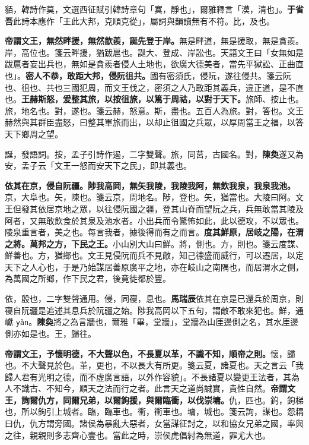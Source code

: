 \begin{quoting}貊，韓詩作莫，文選西征賦引韓詩章句「寞，靜也」，爾雅釋言「漠，清也」。\textbf{于省吾}此詩本應作「王此大邦，克順克從」，屬詞與韻讀無有不符。比，及也。\end{quoting}

\textbf{帝謂文王，無然畔援，無然歆羨，誕先登于岸。}{\footnotesize 無是畔道，無是援取，無是貪羨。岸，高位也。箋云畔援，猶跋扈也。誕大、登成、岸訟也。天語文王曰「女無如是跋扈者妄出兵也，無如是貪羨者侵人土地也，欲廣大德美者，當先平獄訟、正曲直也」。}\textbf{密人不恭，敢距大邦，侵阮徂共。}{\footnotesize 國有密須氏，侵阮，遂往侵共。箋云阮也、徂也、共也三國犯周，而文王伐之，密須之人乃敢距其義兵，違正道，是不直也。}\textbf{王赫斯怒，爰整其旅，以按徂旅，以篤于周祜，以對于天下。}{\footnotesize 旅師、按止也。旅，地名也。對，遂也。箋云赫，怒意。斯，盡也。五百人為旅。對，答也。文王赫然與其群臣盡怒，曰整其軍旅而出，以却止徂國之兵眾，以厚周當王之福，以答天下鄉周之望。}

\begin{quoting}誕，發語詞。按，孟子引詩作遏，二字雙聲。旅，同莒，古國名。對，\textbf{陳奐}遂又為安，孟子云「文王一怒而安天下之民」，即其義也。\end{quoting}

\textbf{依其在京，侵自阮疆。陟我高岡，無矢我陵，我陵我阿，無飲我泉，我泉我池。}{\footnotesize 京，大阜也。矢，陳也。箋云京，周地名。陟，登也。矢，猶當也。大陵曰阿。文王但發其依居京地之眾，以往侵阮國之疆，登其山脊而望阮之兵，兵無敢當其陵及阿者，又無敢飲食於其泉及池水者。小出兵而令驚怖如此，此以德攻，不以眾也。陵泉重言者，美之也。每言我者，據後得而有之而言。}\textbf{度其鮮原，居岐之陽，在渭之將。萬邦之方，下民之王。}{\footnotesize 小山別大山曰鮮。將，側也。方，則也。箋云度謀、鮮善也。方，猶鄉也。文王見侵阮而兵不見敵，知己德盛而威行，可以遷居，以定天下之人心也，于是乃始謀居善原廣平之地，亦在岐山之南隅也，而居渭水之側，為萬國之所鄉，作下民之君，後竟徙都於豐。}

\begin{quoting}依，殷也，二字雙聲通用。侵，同寑，息也。\textbf{馬瑞辰}依其在京是已還兵於周京，則寑自阮疆是追述其息兵於阮疆之始。陟我高岡以下五句，謂敵不敢來犯也。鮮，通巘 \texttt{yǎn}。\textbf{陳奐}將之為言牆也，爾雅「畢，堂牆」，堂牆為山厓邊側之名，其水厓邊側亦如是也。王，歸往。\end{quoting}

\textbf{帝謂文王，予懷明德，不大聲以色，不長夏以革，不識不知，順帝之則。}{\footnotesize 懷，歸也。不大聲見於色。革，更也，不以長大有所更。箋云夏，諸夏也。天之言云「我歸人君有光明之德，而不虛廣言語，以外作容貌」。不長諸夏以變更王法者，其為人不識古、不知今，順天之法而行之者。此言天之道尚誠實，貴性自然。}\textbf{帝謂文王，詢爾仇方，同爾兄弟，以爾鉤援，與爾臨衝，以伐崇墉。}{\footnotesize 仇，匹也。鉤，鉤梯也，所以鉤引上城者。臨，臨車也。衝，衝車也。墉，城也。箋云詢，謀也。怨耦曰仇，仇方謂旁國。諸侯為暴亂大惡者，女當謀征討之，以和協女兄弟之國，率與之往，親親則多志齊心壹也。當此之時，崇侯虎倡紂為無道，罪尤大也。}

